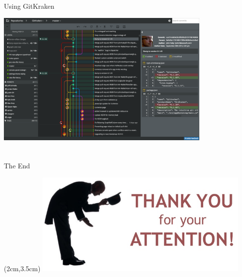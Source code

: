 \documentclass[xcolor=dvipsnames]{beamer}
\begin{document}
\begin{frame}{Using GitKraken}

\includegraphics[width = 0.8\textwidth]{gitkraken.png}

\end{frame}

\section{}

\begin{frame}{The End}

\begin{textblock*}{10cm}(2cm,3.5cm) %
\includegraphics[width = 0.8\textwidth]{thankYou.png}
\end{textblock*}

\end{frame}
\end{document}
